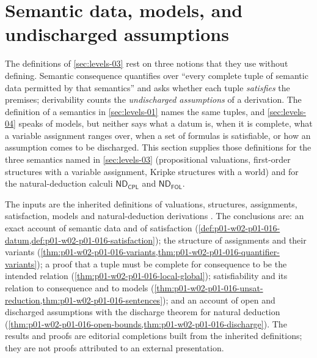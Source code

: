 \section{Semantic data, models, and undischarged assumptions}
\label{sec:p01-w02-p01-016-semantic-data}

The definitions of \cref{sec:levels-03} rest on three notions that they use
without defining. Semantic consequence quantifies over ``every complete tuple
of semantic data permitted by that semantics'' and asks whether each tuple
\emph{satisfies} the premises; derivability counts the \emph{undischarged
assumptions} of a derivation. The definition of a semantics in
\cref{sec:levels-01} names the same tuples, and \cref{sec:levels-04} speaks of
models, but neither says what a datum is, when it is complete, what a
variable assignment ranges over, when a set of formulas is satisfiable, or
how an assumption comes to be discharged. This section supplies those
definitions for the three semantics named in \cref{sec:levels-03}
(propositional valuations, first-order structures with a variable
assignment, Kripke structures with a world) and for the natural-deduction
calculi \(\mathsf{ND}_{\mathsf{CPL}}\) and \(\mathsf{ND}_{\mathsf{FOL}}\).

The inputs are the inherited definitions of valuations, structures,
assignments, satisfaction, models and natural-deduction derivations
\cite[chs.~``Levels, Objects, and Consequence'', ``Propositional Syntax and
Semantics'', ``Natural Deduction and Sequents'', ``Structures, Satisfaction,
and Translation'', ``Theories and Axiomatization'', ``First-Order
Deduction'']{FrozenFormalLogicSemanticData}. The conclusions are: an exact
account of semantic data and of satisfaction
(\cref{def:p01-w02-p01-016-datum,def:p01-w02-p01-016-satisfaction}); the
structure of assignments and their variants
(\cref{thm:p01-w02-p01-016-variants,thm:p01-w02-p01-016-quantifier-variants});
a proof that a tuple must be complete for consequence to be the intended
relation (\cref{thm:p01-w02-p01-016-local-global}); satisfiability and its
relation to consequence and to models
(\cref{thm:p01-w02-p01-016-unsat-reduction,thm:p01-w02-p01-016-sentences}); and
an account of open and discharged assumptions with the discharge theorem for
natural deduction
(\cref{thm:p01-w02-p01-016-open-bounds,thm:p01-w02-p01-016-discharge}). The
results and proofs are editorial completions built from the inherited
definitions; they are not proofs attributed to an external presentation.

